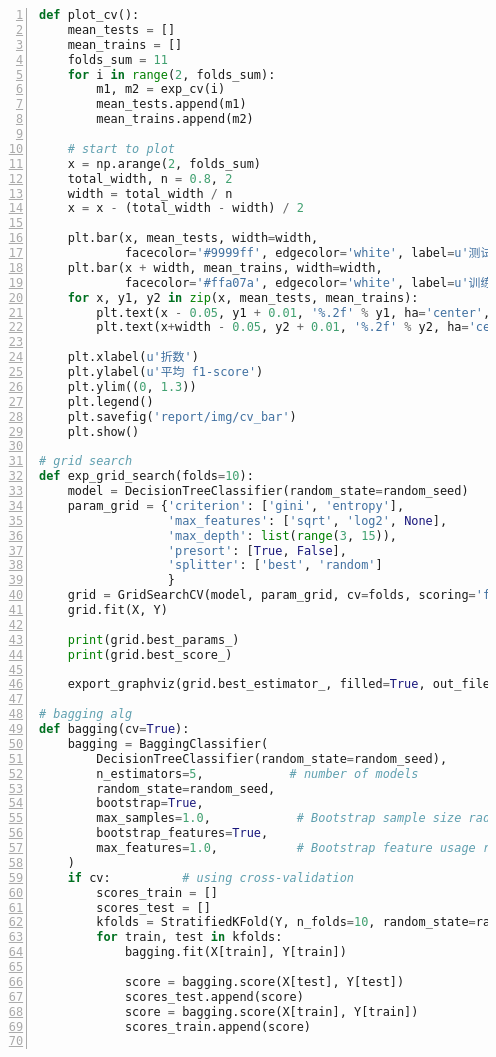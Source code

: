 \documentclass[12pt,a4paper]{article}
\theoremstyle{definition}
\begin{document}
\begin{appendix}
\begin{lstlisting}[language=Python,
	numbers=left,
	keywordstyle=\color{blue!70},
	frame=shadowbox,
	breaklines=True]
def plot_cv():
    mean_tests = []
    mean_trains = []
    folds_sum = 11
    for i in range(2, folds_sum):
        m1, m2 = exp_cv(i)
        mean_tests.append(m1)
        mean_trains.append(m2)

    # start to plot
    x = np.arange(2, folds_sum)
    total_width, n = 0.8, 2
    width = total_width / n
    x = x - (total_width - width) / 2

    plt.bar(x, mean_tests, width=width,
            facecolor='#9999ff', edgecolor='white', label=u'测试集')
    plt.bar(x + width, mean_trains, width=width,
            facecolor='#ffa07a', edgecolor='white', label=u'训练集')
    for x, y1, y2 in zip(x, mean_tests, mean_trains):
        plt.text(x - 0.05, y1 + 0.01, '%.2f' % y1, ha='center', va='bottom')
        plt.text(x+width - 0.05, y2 + 0.01, '%.2f' % y2, ha='center', va='bottom')

    plt.xlabel(u'折数')
    plt.ylabel(u'平均 f1-score')
    plt.ylim((0, 1.3))
    plt.legend()
    plt.savefig('report/img/cv_bar')
    plt.show()

# grid search
def exp_grid_search(folds=10):
    model = DecisionTreeClassifier(random_state=random_seed)
    param_grid = {'criterion': ['gini', 'entropy'],
                  'max_features': ['sqrt', 'log2', None],
                  'max_depth': list(range(3, 15)),
                  'presort': [True, False],
                  'splitter': ['best', 'random']
                  }
    grid = GridSearchCV(model, param_grid, cv=folds, scoring='f1_weighted')
    grid.fit(X, Y)

    print(grid.best_params_)
    print(grid.best_score_)

    export_graphviz(grid.best_estimator_, filled=True, out_file='report/img/gs.dot')

# bagging alg
def bagging(cv=True):
    bagging = BaggingClassifier(
        DecisionTreeClassifier(random_state=random_seed),
        n_estimators=5,            # number of models
        random_state=random_seed,
        bootstrap=True,
        max_samples=1.0,            # Bootstrap sample size radio
        bootstrap_features=True,
        max_features=1.0,           # Bootstrap feature usage radio
    )
    if cv:          # using cross-validation
        scores_train = []
        scores_test = []
        kfolds = StratifiedKFold(Y, n_folds=10, random_state=random_seed)
        for train, test in kfolds:
            bagging.fit(X[train], Y[train])

            score = bagging.score(X[test], Y[test])
            scores_test.append(score)
            score = bagging.score(X[train], Y[train])
            scores_train.append(score)


\end{lstlisting}
\end{appendix}
\end{document}
